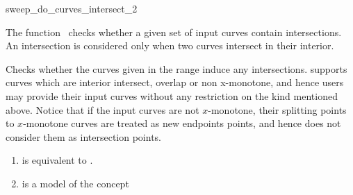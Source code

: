 

\begin{ccRefFunction}{sweep_do_curves_intersect_2} %


\ccDefinition
  
The function \ccRefName\ checks whether a given set of input curves 
contain intersections. An intersection is considered only when 
two curves intersect in their interior. 


   {Checks whether the curves given in the range 
   \ccStyle{[curves_begin, curves_end)} induce any intersections.
    supports
   curves which are interior intersect, overlap or non x-monotone, and
   hence users may provide their input curves without any
   restriction on the kind mentioned above. 
   Notice that if the input curves are not $x$-monotone, their splitting points 
   to $x$-monotone curves are treated as new endpoints points, and hence 
    does not consider them as intersection points.}

\begin{enumerate}
   \item    {} is equivalent to .
   \item    {} is a model of the  concept
\end{enumerate}


\ccSeeAlso
{} \\
 \\


\end{ccRefFunction}

